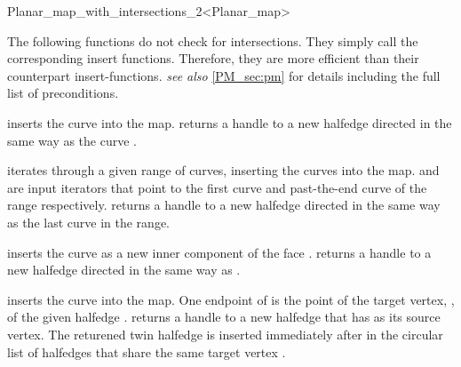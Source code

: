 \begin{ccRefClass}{Planar_map_with_intersections_2<Planar_map>}
\begin{ccAdvanced}
The following functions do not check for intersections. They simply
call the  corresponding insert functions. Therefore,
they are more efficient than their counterpart insert-functions.
{\em see also} \ref{PM_sec:pm} for details including the full list of
preconditions.

         {inserts the curve  into the
	 map.  returns a handle to a new
	 halfedge directed in the same way as the curve .
	 }

  {iterates through a given range of curves, inserting the curves into
  the map.  and  are input iterators that point to
  the first curve and past-the-end curve of the range
  respectively.  returns a handle to a
  new halfedge directed in the same way as the last curve in the range.
  }

  {inserts the curve  as a new inner component of the face
  .  returns a
  handle to a new halfedge directed in the same way as .
  }

  {inserts the curve  into the map. One endpoint of 
  is the point of the target vertex, , of the given halfedge
  .  returns a handle
  to a new halfedge that has   as its source vertex. The
  returened twin halfedge is inserted immediately after  in the
  circular list of halfedges that share the same target vertex
  .
  }


\end{ccAdvanced}
\end{ccRefClass}

